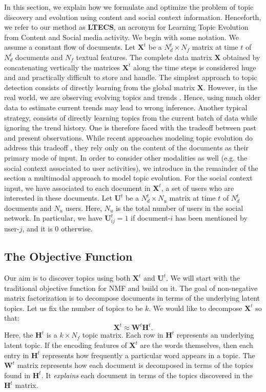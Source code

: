 In this section, we explain how we formulate and optimize the problem of topic discovery and evolution
using content and social context
information.  Henceforth, we refer to our method as \textbf{LTECS}, an acronym for Learning Topic
Evolution from Content
and Social media activity.  We begin with some notation.  We assume a constant flow of documents.
Let $\mathbf{X}^t$ be a $N_d^t \times N_f$ matrix at time $t$ of $N_d^t$ documents and $N_f$ 
textual features.
The complete data matrix $\mathbf{X}$ obtained by concatenating vertically the matrices $\mathbf{X}^t$ along the time steps is considered huge and 
and practically difficult to store and handle.
The simplest approach to topic detection consists of directly learning from the global matrix $\mathbf{X}$.
However, in the real world, we are observing evolving topics and trends \cite{McCallum:2007}.
Hence, using much older data to estimate current trends may lead to wrong inference. 
Another typical strategy, consists of directly learning topics from the current batch of data while 
ignoring the trend history.  One is therefore faced with the tradeoff between past and present observations.
While recent approaches modeling topic evolution do address this tradeoff \cite{Vaca:2014, AlSumait:2008}, they rely
only on the content of the documents as their primary mode of input.
In order to consider other modalities as well (e.g. the social context associated to user activities), we introduce 
in the remainder of the section a multimodal approach to model topic evolution.
For the social context input, we have associated to each document in $\mathbf{X}^t$,
a set of users who are interested in these documents.  Let
$\mathbf{U}^t$ be a $N_d^t \times N_u$ matrix at time $t$ of $N_d^t$ documents and $N_u$ users.  Here,
$N_u$ is the total number of users in the social network.  In particular, we have $\mathbf{U}^t_{ij} = 1$ if
document-$i$ has been mentioned by user-$j$, and it is $0$ otherwise.
\vspace{-0.1cm}
\subsection{The Objective Function}
Our aim is to discover topics using both $\mathbf{X}^t$ and $\mathbf{U}^t$.  We will start with
the traditional objective function for NMF and build on it.
The goal of non-negative matrix factorization is to decompose documents in terms of the underlying
latent topics.  Let us fix the number of topics to be $k$.  We would like to decompose $\mathbf{X}^t$
so that:
\begin{equation}
	\mathbf{X}^t \approx \mathbf{W}^t\mathbf{H}^t. \label{eq:topic_decomp}
\end{equation}
Here, the $\mathbf{H}^t$ is a $k \times N_f$ topic matrix.  Each row in $\mathbf{H}^t$ represents
an underlying latent topic. If the encoding features of $\mathbf{X}^t$ are the words themselves, then each entry
in $\mathbf{H}^t$ represents how frequently a particular word appears in a topic.  The $\mathbf{W}^t$ matrix
represents how each document is decomposed in terms of the topics found in $\mathbf{H}^t$.  It \emph{explains}
each document in terms of the topics discovered in the $\mathbf{H}^t$ matrix.

